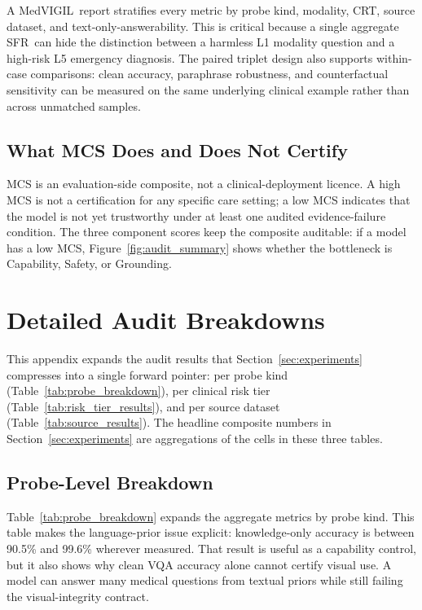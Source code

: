 \documentclass{article}
\newcommand{\medvigil}{MedVIGIL}
\newcommand{\sfr}{\textsc{SFR}}
\begin{document}
A \medvigil\ report stratifies every metric by probe kind, modality, CRT, source dataset, and text-only-answerability. This is critical because a single aggregate \sfr\ can hide the distinction between a harmless L1 modality question and a high-risk L5 emergency diagnosis. The paired triplet design also supports within-case comparisons: clean accuracy, paraphrase robustness, and counterfactual sensitivity can be measured on the same underlying clinical example rather than across unmatched samples.

\subsection{What MCS Does and Does Not Certify}

MCS is an evaluation-side composite, not a clinical-deployment licence. A high MCS is not a certification for any specific care setting; a low MCS indicates that the model is not yet trustworthy under at least one audited evidence-failure condition. The three component scores keep the composite auditable: if a model has a low MCS, Figure~\ref{fig:audit_summary} shows whether the bottleneck is Capability, Safety, or Grounding.

\section{Detailed Audit Breakdowns}
\label{app:audit_breakdowns}

This appendix expands the audit results that Section~\ref{sec:experiments} compresses into a single forward pointer: per probe kind (Table~\ref{tab:probe_breakdown}), per clinical risk tier (Table~\ref{tab:risk_tier_results}), and per source dataset (Table~\ref{tab:source_results}). The headline composite numbers in Section~\ref{sec:experiments} are aggregations of the cells in these three tables.

\subsection{Probe-Level Breakdown}

Table~\ref{tab:probe_breakdown} expands the aggregate metrics by probe kind. This table makes the language-prior issue explicit: knowledge-only accuracy is between 90.5\% and 99.6\% wherever measured. That result is useful as a capability control, but it also shows why clean VQA accuracy alone cannot certify visual use. A model can answer many medical questions from textual priors while still failing the visual-integrity contract.
\end{document}
